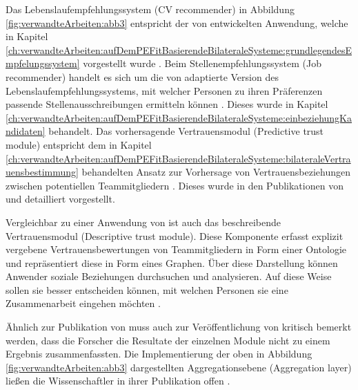 Das Lebenslaufempfehlungssystem (CV recommender) in Abbildung \ref{fig:verwandteArbeiten:abb3} entspricht der von \textcite[S. 8ff.]{faerber:2003} entwickelten Anwendung, welche in Kapitel \ref{ch:verwandteArbeiten:aufDemPEFitBasierendeBilateraleSysteme:grundlegendesEmpfelungssystem} vorgestellt wurde \cite[S. 6]{keim:2007}. Beim Stellenempfehlungssystem (Job recommender) handelt es sich um die von \textcite[S. 4ff.]{malinowski:2006} adaptierte Version des Lebenslaufempfehlungssystems, mit welcher Personen zu ihren Präferenzen passende Stellenausschreibungen ermitteln können \cite[S. 6]{keim:2007}. Dieses wurde in Kapitel \ref{ch:verwandteArbeiten:aufDemPEFitBasierendeBilateraleSysteme:einbeziehungKandidaten} behandelt. Das vorhersagende Vertrauensmodul (Predictive trust module) entspricht dem in Kapitel \ref{ch:verwandteArbeiten:aufDemPEFitBasierendeBilateraleSysteme:bilateraleVertrauensbestimmung} behandelten Ansatz zur Vorhersage von Vertrauensbeziehungen zwischen potentiellen Teammitgliedern \cite[S. 8]{keim:2007}. Dieses wurde in den Publikationen von \textcite[S. 5ff.]{keim:2005} und \textcite[S. 4ff.]{malinowski:2005} detailliert vorgestellt.

Vergleichbar zu einer Anwendung von \textcite[S. 4f.]{keim:2005} ist auch das beschreibende Vertrauensmodul (Descriptive trust module). Diese Komponente erfasst explizit vergebene Vertrauensbewertungen von Teammitgliedern in Form einer Ontologie und repräsentiert diese in Form eines Graphen. Über diese Darstellung können Anwender soziale Beziehungen durchsuchen und analysieren. Auf diese Weise sollen sie besser entscheiden können, mit welchen Personen sie eine Zusammenarbeit eingehen möchten \cite[S. 7]{keim:2007}.

Ähnlich zur Publikation von \textcite[S. 3ff.]{malinowski:2006} muss auch zur Veröffentlichung von \textcite[S. 5ff.]{keim:2007} kritisch bemerkt werden, dass die Forscher die Resultate der einzelnen Module nicht zu einem Ergebnis zusammenfassten. Die Implementierung der oben in Abbildung \ref{fig:verwandteArbeiten:abb3} dargestellten Aggregationsebene (Aggregation layer) ließen die Wissenschaftler in ihrer Publikation offen \cite[S. 8]{keim:2007}.

